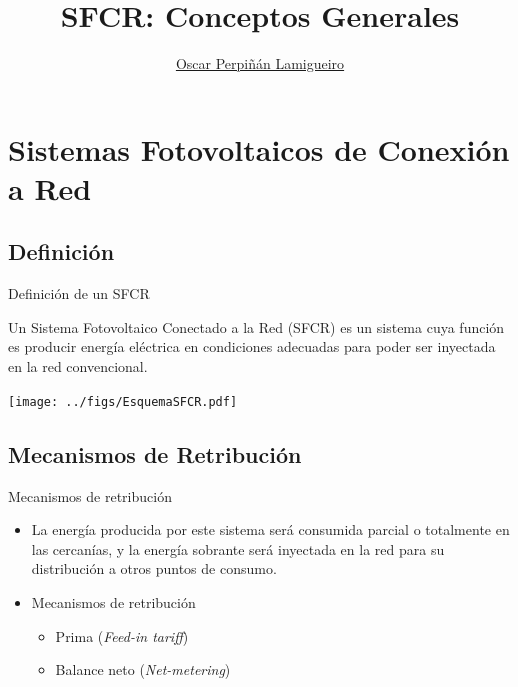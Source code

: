 \documentclass[xcolor={usenames,svgnames,dvipsnames}]{beamer}
\author{\href{https://oscarperpinan.github.io}{Oscar Perpiñán Lamigueiro}}
\date{}
\title{SFCR: Conceptos Generales}
\institute[UPM]{Universidad Politécnica de Madrid}
\begin{document}
\maketitle

\section{Sistemas Fotovoltaicos de Conexión a Red}
\label{sec:orgce2a6f5}

\subsection{Definición}
\label{sec:org4c7107c}

\begin{frame}[label={sec:org0e76ab2}]{Definición de un SFCR}
\begin{block}{}
Un Sistema Fotovoltaico Conectado a la Red (SFCR) es un sistema cuya
función es producir energía eléctrica en condiciones adecuadas para
poder ser inyectada en la red convencional.

\begin{center}
\texttt{[image: ../figs/EsquemaSFCR.pdf]}
\end{center}
\end{block}
\end{frame}

\subsection{Mecanismos de Retribución}
\label{sec:org160ed0f}
\begin{frame}[label={sec:org4b90c62}]{Mecanismos de retribución}
\begin{itemize}
\item La energía producida por este sistema será consumida parcial o totalmente en las cercanías, y la energía sobrante será inyectada en la red para su distribución a otros puntos de consumo.

\item Mecanismos de retribución

\begin{itemize}
\item Prima (\emph{Feed-in tariff})

\item Balance neto (\emph{Net-metering})
\end{itemize}
\end{itemize}
\end{frame}
\end{document}
